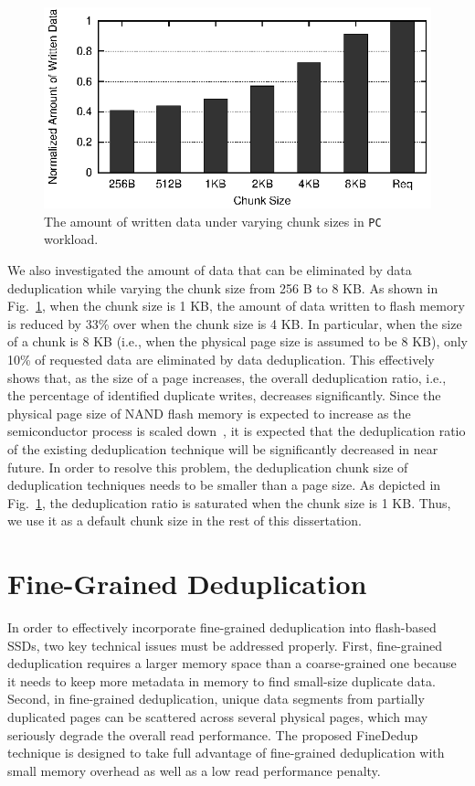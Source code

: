 \begin{figure}[t]
	\center
	\includegraphics[scale=1]{figure/finededup/nonDuplicatedData_ChunkSize}
	\caption{The amount of written data under varying chunk sizes in \texttt{PC} workload.} %
	\label{fig:chunksize}
\end{figure}

We also investigated the amount of data that can be eliminated by data deduplication 
while varying the chunk size from 256 B to 8 KB.
As shown in Fig.~\ref{fig:chunksize}, 
when the chunk size is 1 KB, 
the amount of data written to flash memory is reduced by 33\% over when the chunk size is 4 KB.
In particular, when the size of a chunk is 8 KB (i.e., when the physical page size is assumed to be 8 KB),
only 10\% of requested data are eliminated by data deduplication.
This effectively shows that, as the size of a page increases,
the overall deduplication ratio, i.e., the percentage of identified duplicate writes, decreases significantly.
Since the physical page size of NAND flash memory is expected to increase as the semiconductor process is scaled down~\cite{tlc,16kpage},
it is expected that the deduplication ratio of the existing deduplication technique will be significantly 
decreased in near future.
In order to resolve this problem, the deduplication chunk size of deduplication techniques needs to be smaller than a page size.
As depicted in Fig.~\ref{fig:chunksize}, 
the deduplication ratio is saturated when the chunk size is 1 KB.
Thus, we use it as a default chunk size in the rest of this dissertation.



\section{Fine-Grained Deduplication}
\label{sec:finededup_finededup}
In order to effectively incorporate fine-grained deduplication into flash-based SSDs,
two key technical issues must be addressed properly.
First, fine-grained deduplication requires a larger memory space than a coarse-grained one 
because it needs to keep more metadata in memory to find small-size duplicate data.
Second, in fine-grained deduplication, 
unique data segments from partially duplicated pages can be scattered across several physical pages,
which may seriously degrade the overall read performance.
The proposed FineDedup technique is designed to take full advantage of fine-grained deduplication
with small memory overhead as well as a low read performance penalty.

